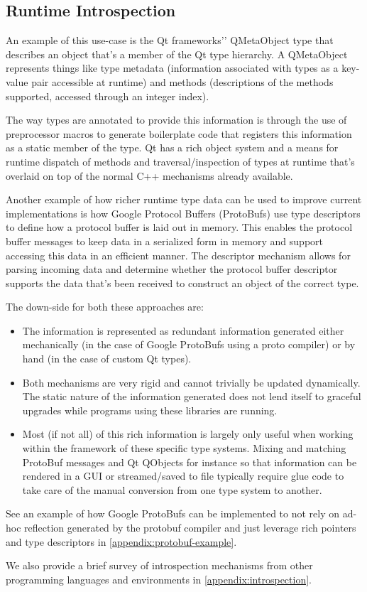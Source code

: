 \subsection{Runtime Introspection}

An example of this use-case is the Qt frameworks'’ QMetaObject type that
describes an object that’s a member of the Qt type hierarchy. A QMetaObject
represents things like type metadata (information associated with types as a
key-value pair accessible at runtime) and methods (descriptions of the methods
supported, accessed through an integer index).

The way types are annotated to provide this information is through the use of
preprocessor macros to generate boilerplate code that registers this
information as a static member of the type. Qt has a rich object system and a
means for runtime dispatch of methods and traversal/inspection of types at
runtime that’s overlaid on top of the normal C++ mechanisms already available.

Another example of how richer runtime type data can be used to improve current
implementations is how Google Protocol Buffers (ProtoBufs) use type
descriptors to define how a protocol buffer is laid out in memory. This
enables the protocol buffer messages to keep data in a serialized form in
memory and support accessing this data in an efficient manner. The descriptor
mechanism allows for parsing incoming data and determine whether the protocol
buffer descriptor supports the data that’s been received to construct an
object of the correct type.

The down-side for both these approaches are:

\begin{itemize}

  \item The information is represented as redundant information generated
  either mechanically (in the case of Google ProtoBufs using a proto compiler)
  or by hand (in the case of custom Qt types).

  \item Both mechanisms are very rigid and cannot trivially be updated
  dynamically. The static nature of the information generated does not lend
  itself to graceful upgrades while programs using these libraries are
  running.

  \item Most (if not all) of this rich information is largely only useful when
  working within the framework of these specific type systems. Mixing and
  matching ProtoBuf messages and Qt QObjects for instance so that information
  can be rendered in a GUI or streamed/saved to file typically require glue
  code to take care of the manual conversion from one type system to another.

\end{itemize}

See an example of how Google ProtoBufs can be implemented to not rely on
ad-hoc reflection generated by the protobuf compiler and just leverage rich
pointers and type descriptors in \autoref{appendix:protobuf-example}.

We also provide a brief survey of introspection mechanisms from other programming languages and environments in \autoref{appendix:introspection}.
